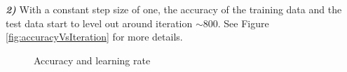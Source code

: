 \documentclass[10pt,letterpaper]{article}
\begin{document}
\textbf{\textit{2)}} With a constant step size of one, the accuracy of the training data and the test data start to level out around iteration $\sim800$.  See Figure \ref{fig:accuracyVsIteration} for more details.\\
\begin{figure}[ht]
  \centering
  \caption{Accuracy and learning rate}
  \label{fig:figure}
\end{figure}
\end{document}
